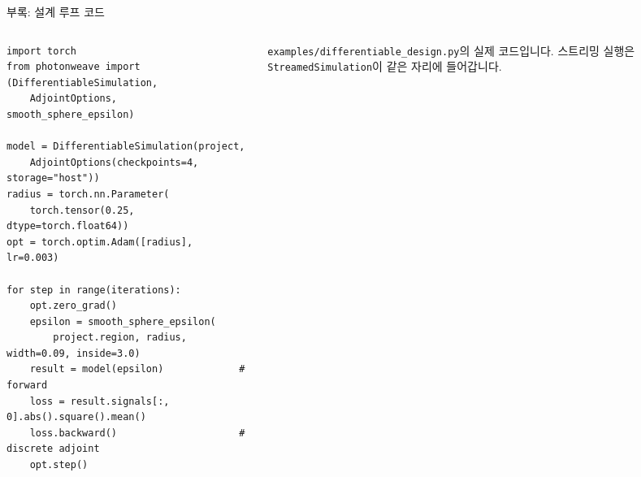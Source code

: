 \documentclass[aspectratio=169,11pt]{beamer}
\begin{document}
\begin{frame}[fragile]{부록: 설계 루프 코드}
  \begin{columns}[T]
    \begin{column}{.55\textwidth}
\begin{lstlisting}[basicstyle=\ttfamily\tiny]
import torch
from photonweave import (DifferentiableSimulation,
    AdjointOptions, smooth_sphere_epsilon)

model = DifferentiableSimulation(project,
    AdjointOptions(checkpoints=4, storage="host"))
radius = torch.nn.Parameter(
    torch.tensor(0.25, dtype=torch.float64))
opt = torch.optim.Adam([radius], lr=0.003)

for step in range(iterations):
    opt.zero_grad()
    epsilon = smooth_sphere_epsilon(
        project.region, radius, width=0.09, inside=3.0)
    result = model(epsilon)             # forward
    loss = result.signals[:, 0].abs().square().mean()
    loss.backward()                     # discrete adjoint
    opt.step()
\end{lstlisting}
    \end{column}
    \begin{column}{.42\textwidth}
      \footnotesize
      \texttt{examples/differentiable\_design.py}의 실제 코드입니다.
      스트리밍 실행은 \texttt{StreamedSimulation}이 같은 자리에 들어갑니다.
      \vspace{2mm}
    \end{column}
  \end{columns}
\end{frame}
\end{document}

